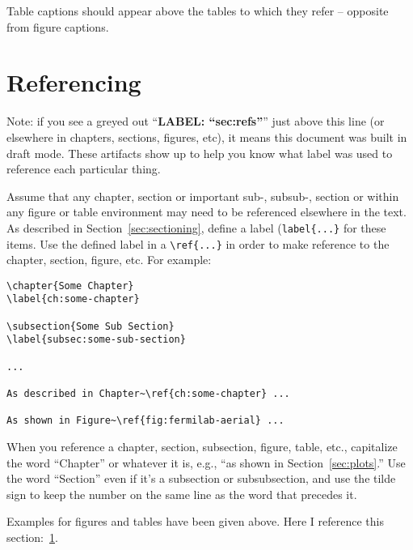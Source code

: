 Table captions should appear above the tables to which they refer -- opposite from figure captions.

\section{Referencing}
\label{sec:refs}

Note: if you see a greyed out ``\textbf{LABEL: ``sec:refs''}'' just above this
line (or elsewhere in chapters, sections, figures, etc), it means this
document was built in draft mode.  These artifacts show up to help you know what label
was used to reference each particular thing.

Assume that any chapter, section or important sub-, subsub-,  section or
within any figure or table environment may need to be referenced
elsewhere in the text. As described in Section~\ref{sec:sectioning}, define a label (\verb|label{...}|
for these items.
Use the defined label in a \verb|\ref{...}| in order to
make reference to the chapter, section, figure, etc.  For example:

\begin{verbatim}
\chapter{Some Chapter}
\label{ch:some-chapter}

\subsection{Some Sub Section}
\label{subsec:some-sub-section}

...

As described in Chapter~\ref{ch:some-chapter} ...

As shown in Figure~\ref{fig:fermilab-aerial} ...
\end{verbatim}

When you reference a chapter, section, subsection, figure, table, etc., capitalize the word ``Chapter'' or whatever it is, e.g., ``as shown in Section~\ref{sec:plots}.''  Use the word ``Section'' even if it's a subsection or subsubsection, and use the tilde sign to keep the number on the same line as the word that precedes it.

Examples for figures and tables have been given above.  Here I
reference this section:~\ref{sec:refs}.  



